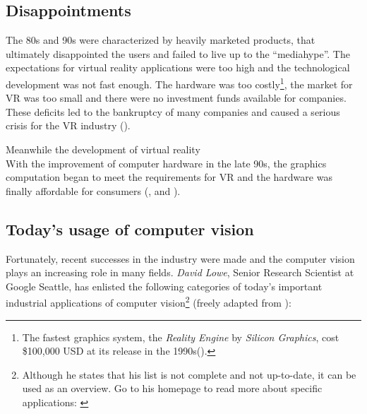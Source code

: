 \subsection{Disappointments}
The 80s and 90s were characterized by heavily marketed products, that ultimately disappointed the users and failed to live up to the \enquote{mediahype}. The expectations for virtual reality applications were too high and the technological development was not fast enough. The hardware was too costly\footnote{The fastest graphics system, the \textit{Reality Engine} by \textit{Silicon Graphics}, cost \$100,000 USD at its release in the 1990s(\cite[p.10]{Burdea.2003}).}, the market for VR was too small and there were no investment funds available for companies. These deficits led to the bankruptcy of many companies and caused a serious crisis for the VR industry (\cite[p.10]{Burdea.2003}). 

Meanwhile the development of virtual reality  \\

With the improvement of computer hardware in the late 90s, the graphics computation began to meet the requirements for VR and the hardware was finally affordable for consumers (\cite[p.10 et seq.]{Burdea.2003}, \cite{Doerner.2013} and \cite[p.3]{Toennis.2010}).

\subsection{Today's usage of computer vision}\label{ssec:Today}
Fortunately, recent successes in the industry were made and the computer vision plays an increasing role in many fields. \textit{David Lowe}, Senior Research Scientist at Google Seattle, has enlisted the following categories of today's important industrial applications of computer vision\footnote{Although he states that his list is not complete and not up-to-date, it can be used as an overview. Go to his homepage to read more about specific applications: \cite{Lowe.2016}} (freely adapted from \cite{Lowe.2016}): 

